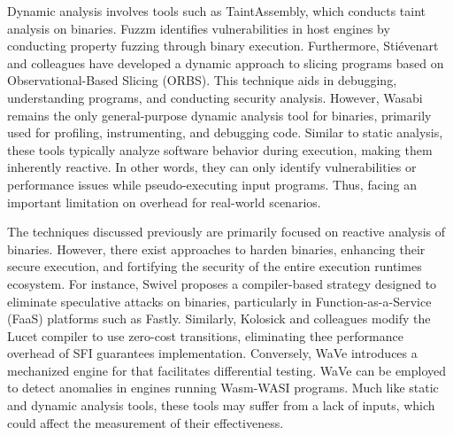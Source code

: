  Dynamic analysis involves tools such as TaintAssembly\cite{taintassembly}, which conducts taint analysis on \Wasm binaries. 
Fuzzm\cite{fuzzm} identifies vulnerabilities in host engines by conducting property fuzzing through \Wasm binary execution. 
Furthermore, Stiévenart and colleagues have developed a dynamic approach to slicing \Wasm programs based on Observational-Based Slicing (ORBS)\cite{slicing, slicing2}.
This technique aids in debugging, understanding programs, and conducting security analysis.
However, Wasabi\cite{wasabi} remains the only general-purpose dynamic analysis tool for \Wasm binaries, primarily used for profiling, instrumenting, and debugging \Wasm code. 
Similar to static analysis, these tools typically analyze software behavior during execution, making them inherently reactive. 
In other words, they can only identify vulnerabilities or performance issues while pseudo-executing input \Wasm programs.
Thus, facing an important limitation on overhead for real-world scenarios. 

The techniques discussed previously are primarily focused on reactive analysis of \Wasm binaries.
However, there exist approaches to harden \Wasm binaries, enhancing their secure execution, and fortifying the security of the entire execution runtimes ecosystem. 
For instance, Swivel\cite{Swivel} proposes a compiler-based strategy designed to eliminate speculative attacks on \Wasm binaries, particularly in Function-as-a-Service (FaaS) platforms such as Fastly. 
Similarly, Kolosick and colleagues \cite{10.1145/3498688} modify the Lucet compiler to use zero-cost transitions, eliminating thee performance overhead of SFI guarantees implementation.
Conversely, WaVe\cite{wave} introduces a mechanized engine for \Wasm that facilitates differential testing. 
WaVe can be employed to detect anomalies in engines running Wasm-WASI programs. 
Much like static and dynamic analysis tools, these tools may suffer from a lack of \Wasm inputs, which could affect the measurement of their effectiveness.



